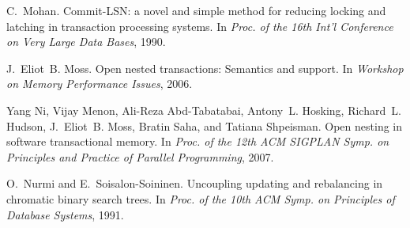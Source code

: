 \begin{thebibliography}{99}
{
C.~Mohan.
\newblock Commit-{LSN}: a novel and simple method for reducing locking and
  latching in transaction processing systems.
\newblock In {\em Proc. of the 16th Int'l Conference on Very Large Data Bases},
  1990.




J.~Eliot~B. Moss.
\newblock Open nested transactions: Semantics and support.
\newblock In {\em Workshop on Memory Performance Issues}, 2006.



Yang Ni, Vijay Menon, Ali-Reza Abd-Tabatabai, Antony~L. Hosking, Richard~L.
  Hudson, J.~Eliot~B. Moss, Bratin Saha, and Tatiana Shpeisman.
\newblock Open nesting in software transactional memory.
\newblock In {\em Proc. of the 12th ACM SIGPLAN Symp. on Principles and
  Practice of Parallel Programming}, 2007.


% 


O.~Nurmi and E.~Soisalon-Soininen.
\newblock Uncoupling updating and rebalancing in chromatic binary search trees.
\newblock In {\em Proc. of the 10th ACM Symp. on Principles of Database
  Systems}, 1991.




}
\end{thebibliography}
